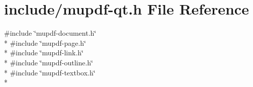 \hypertarget{mupdf-qt_8h}{\section{include/mupdf-\/qt.h File Reference}
\label{mupdf-qt_8h}
}
{\ttfamily \#include \char`\"{}mupdf-\/document.\-h\char`\"{}}\\*
{\ttfamily \#include \char`\"{}mupdf-\/page.\-h\char`\"{}}\\*
{\ttfamily \#include \char`\"{}mupdf-\/link.\-h\char`\"{}}\\*
{\ttfamily \#include \char`\"{}mupdf-\/outline.\-h\char`\"{}}\\*
{\ttfamily \#include \char`\"{}mupdf-\/textbox.\-h\char`\"{}}\\*
